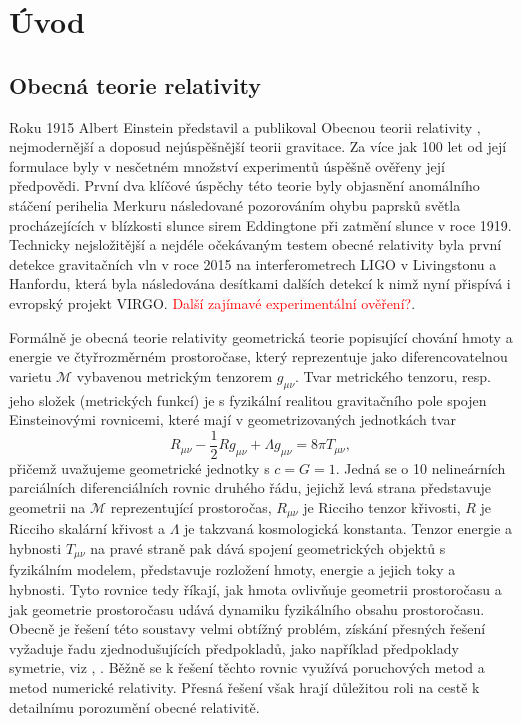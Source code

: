 \chapter*{Úvod}

\section*{Obecná teorie relativity}

Roku 1915 Albert Einstein představil a publikoval Obecnou teorii relativity \cite{Einstein1915}, nejmodernější a doposud nejúspěšnější teorii gravitace. Za více jak 100 let od její formulace byly v nesčetném množství
experimentů úspěšně ověřeny její předpovědi. První dva klíčové úspěchy této teorie byly objasnění anomálního stáčení perihelia Merkuru následované pozorováním ohybu paprsků světla procházejících v blízkosti slunce
sirem Eddingtone při zatmění slunce v roce 1919.
Technicky nejsložitější a nejdéle očekávaným testem obecné relativity byla první detekce gravitačních vln v roce 2015 na interferometrech LIGO v Livingstonu a Hanfordu, která byla následována
desítkami dalších detekcí k nimž nyní přispívá i evropský projekt VIRGO. \textcolor{red}{Další zajímavé experimentální ověření?}.


Formálně je obecná teorie relativity geometrická teorie popisující chování hmoty a energie ve čtyřrozměrném prostoročase, který reprezentuje jako diferencovatelnou varietu $\mathcal{M}$ vybavenou metrickým tenzorem $g_{\mu \nu}$.
Tvar metrického tenzoru, resp. jeho složek (metrických funkcí) je s fyzikální realitou gravitačního pole spojen Einsteinovými rovnicemi, které mají v geometrizovaných jednotkách
tvar
\begin{equation}
    \label{eq:einsten_field_equations}
    R_{\mu \nu} - \frac{1}{2} R g_{\mu \nu} + \Lambda g_{\mu \nu} = 8 \pi T_{\mu \nu},
\end{equation}
přičemž uvažujeme geometrické jednotky s $c = G = 1$.
Jedná se o 10 nelineárních parciálních diferenciálních rovnic druhého řádu, jejichž levá strana představuje geometrii na $\mathcal{M}$ reprezentující prostoročas, $R_{\mu \nu}$ je Ricciho tenzor křivosti, $R$ je Ricciho skalární křivost a $\Lambda$
je takzvaná kosmologická konstanta. Tenzor energie a hybnosti $T_{\mu \nu}$ na pravé straně pak dává spojení geometrických objektů s fyzikálním modelem, představuje rozložení hmoty,
energie a jejich toky a hybnosti. Tyto rovnice tedy říkají, jak hmota ovlivňuje geometrii prostoročasu a jak geometrie prostoročasu udává dynamiku fyzikálního obsahu prostoročasu.
Obecně je řešení této soustavy velmi obtížný problém, získání přesných řešení vyžaduje řadu zjednodušujících předpokladů, jako například
předpoklady symetrie, viz \cite{griffiths_podolsky_2009}, \cite{stephani2003}. Běžně se k řešení těchto rovnic využívá poruchových metod a metod
numerické relativity. Přesná řešení však hrají důležitou roli na cestě k detailnímu porozumění obecné relativitě.


